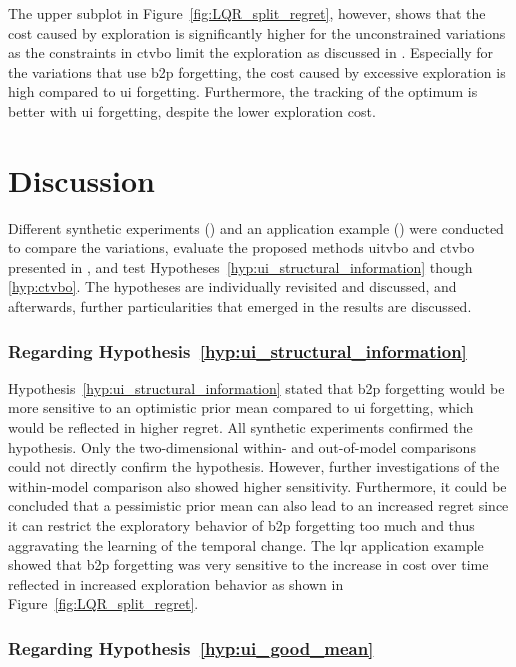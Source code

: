 The upper subplot in Figure~\ref{fig:LQR_split_regret}, however, shows that the cost caused by exploration is significantly higher for the unconstrained variations as the constraints in \gls{ctvbo} limit the exploration as discussed in . Especially for the variations that use \gls{b2p} forgetting, the cost caused by excessive exploration is high compared to \gls{ui} forgetting. Furthermore, the tracking of the optimum is better with \gls{ui} forgetting, despite the lower exploration cost.

\section{Discussion}

Different synthetic experiments () and an application example () were conducted to compare the variations, evaluate the proposed methods \gls{uitvbo} and \gls{ctvbo} presented in , and test Hypotheses~\ref{hyp:ui_structural_information} though \ref{hyp:ctvbo}.
The hypotheses are individually revisited and discussed, and afterwards, further particularities that emerged in the results are discussed.

\subsubsection{Regarding Hypothesis~\ref{hyp:ui_structural_information}}

Hypothesis~\ref{hyp:ui_structural_information} stated that \gls{b2p} forgetting would be more sensitive to an optimistic prior mean compared to \gls{ui} forgetting, which would be reflected in higher regret. All synthetic experiments confirmed the hypothesis. Only the two-dimensional within- and out-of-model comparisons could not directly confirm the hypothesis. However, further investigations of the within-model comparison also showed higher sensitivity. Furthermore, it could be concluded that a pessimistic prior mean can also lead to an increased regret since it can restrict the exploratory behavior of \gls{b2p} forgetting too much and thus aggravating the learning of the temporal change. The \gls{lqr} application example showed that \gls{b2p} forgetting was very sensitive to the increase in cost over time reflected in increased exploration behavior as shown in Figure~\ref{fig:LQR_split_regret}. 

\subsubsection{Regarding Hypothesis~\ref{hyp:ui_good_mean}}

